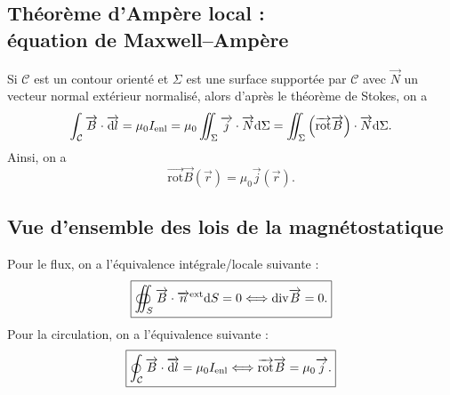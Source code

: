    \subsection[Équation de Maxwell--Ampère]{Théorème d'Ampère local :\\équation de Maxwell--Ampère}

        Si $\mathcal{C}$ est un contour orienté et $\Sigma$ est une surface supportée par $\mathcal{C}$ avec $\vec{N}$ un vecteur normal extérieur normalisé, alors d'après le théorème de Stokes, on a 
        \begin{equation*}
            \int_{\mathcal{C}}\protect\overrightarrow{{B}}\cdot\protect\overrightarrow{{\mathrm{d} l}}=\mu_{0}I_{\mathrm{enl}}=\mu_{0}\iint_{\Sigma}\protect\overrightarrow{{j}}\cdot\protect\overrightarrow{{N}}\mathrm{d}\Sigma=\iint_{\Sigma}\left(\protect\overrightarrow{{\mathrm{rot}}}\protect\overrightarrow{{B}}\right)\cdot\protect\overrightarrow{{N}}\mathrm{d}\Sigma.
        \end{equation*}
        Ainsi, on a 
        \begin{equation*}
            \boxed{
                \vec{\mathrm{rot}}\vec{B}(\vec{r})=\mu_{0}\vec{j}(\vec{r}).
            }
        \end{equation*}

    \subsection{Vue d'ensemble des lois de la magnétostatique}

        Pour le flux, on a l'équivalence intégrale/locale suivante :
        \begin{equation*}
            \boxed{
                \oiint_{S}\protect\overrightarrow{{B}}\cdot\protect\overrightarrow{{n}}^{\mathrm{ext}}\mathrm{d} S=0\Longleftrightarrow\mathrm{div}\protect\overrightarrow{{B}}=0.
            }
        \end{equation*}
        Pour la circulation, on a l'équivalence suivante :
        \begin{equation*}
            \boxed{
                \oint_{\mathcal{C}}\protect\overrightarrow{{B}}\cdot\protect\overrightarrow{{\mathrm{d} l}}=\mu_{0}I_{\mathrm{enl}}\Longleftrightarrow\protect\overrightarrow{{\mathrm{rot}}}\protect\overrightarrow{{B}}=\mu_{0}\protect\overrightarrow{{j}}.
            }
        \end{equation*}

        